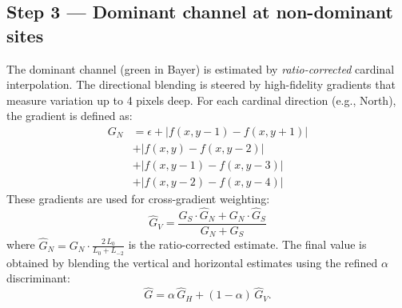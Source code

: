 \documentclass[a4paper,11pt]{article}
\newcommand{\tile}[6][]{%
  \if#4r\def\tilecol{cfared}\else
    \if#4g\def\tilecol{cfagreen}\else
      \if#4b\def\tilecol{cfablue}\else
        \def\tilecol{cfagrey}\fi\fi\fi
  \node[cfa-tile, fill=\tilecol!60, #1] (T#2#3) at (#2*0.8, -#3*0.8) {};
  \ifx&#5&\else\node[cfa-coords, above=0pt of T#2#3] {#5};\fi
  \ifx&#6&\else\node[cfa-weight] at (T#2#3) {#6};\fi
}
\begin{document}
\subsection{Step 3 — Dominant channel at non-dominant sites}
The dominant channel (green in Bayer) is estimated by \emph{ratio-corrected} cardinal interpolation. The directional blending is steered by high-fidelity gradients that measure variation up to 4 pixels deep. For each cardinal direction (e.g., North), the gradient is defined as:
\begin{align*}
    G_N &= \epsilon + |f(x, y-1) - f(x, y+1)| \\
        &+ |f(x, y) - f(x, y-2)| \\
        &+ |f(x, y-1) - f(x, y-3)| \\
        &+ |f(x, y-2) - f(x, y-4)|
\end{align*}
These gradients are used for cross-gradient weighting:
\[
    \hat{G}_V = \frac{G_S \cdot \hat{G}_N + G_N \cdot \hat{G}_S}{G_N + G_S}
\]
where $\hat{G}_N = G_N \cdot \frac{2\,L_0}{L_0 + L_{-2}}$ is the ratio-corrected estimate. The final value is obtained by blending the vertical and horizontal estimates using the refined $\alpha$ discriminant:
\[
  \hat G = \alpha\,\hat G_H + (1-\alpha)\,\hat G_V.
\]

\begin{center}
\end{center}
\end{document}
